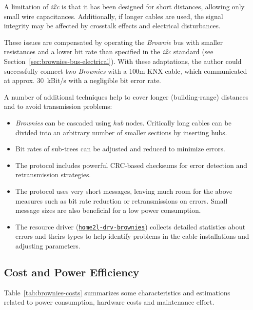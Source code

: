 \documentclass[12pt,english,parskip=half,headheight=19pt]{scrreprt}
\newcommand{\idx}[1]{#1\index{#1}}
\newcommand{\reftool}[1]{\hyperref[tool:#1]{\texttt{\idx{#1}}}}
\begin{document}
A limitation of \textit{i2c} is that it has been designed for short distances, allowing only small wire capacitances. Additionally, if longer cables are used, the signal integrity may be affected by crosstalk effects and electrical disturbances.

These issues are compensated by operating the \textit{Brownie} bus with smaller resistances and a lower bit rate than specified in the \textit{i2c} standard (see Section~\ref{sec:brownies-bus-electrical}). With these adaptations, the author could successfully connect two \textit{Brownies} with a 100m KNX cable, which communicated at approx. 30~kBit/s with a negligible bit error rate.

A number of additional techniques help to cover longer (building-range) distances and to avoid transmission problems:
\begin{itemize}
  \item \textit{Brownies} can be cascaded using \textit{hub} nodes. Critically long cables can be divided into an arbitrary number of smaller sections by inserting hubs.
  \item Bit rates of sub-trees can be adjusted and reduced to minimize errors.
  \item The protocol includes powerful CRC-based checksums for error detection and retransmission strategies.
  \item The protocol uses very short messages, leaving much room for the above measures such as bit rate reduction or retransmissions on errors. Small message sizes are also beneficial for a low power consumption.
  \item The resource driver (\reftool{home2l-drv-brownies}) collects detailed statistics about errors and theirs types to help identify problems in the cable installations and adjusting parameters.
\end{itemize}



\subsection*{Cost and Power Efficiency}

Table~\ref{tab:brownies-costs} summarizes some characteristics and estimations related to power consumption, hardware costs and maintenance effort.
\end{document}
